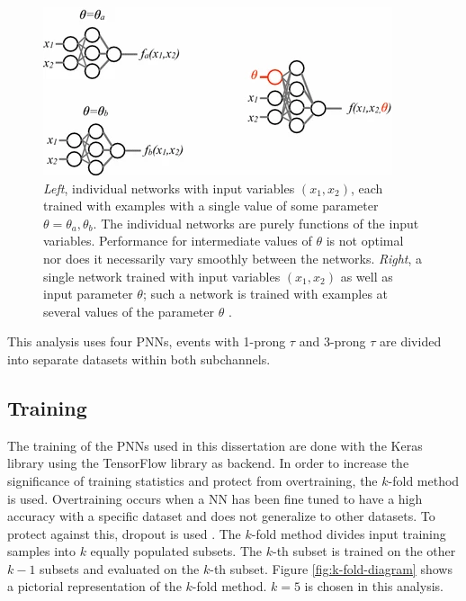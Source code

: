 		\begin{figure}	
			\begin{center}
				\includegraphics[width=.6\textwidth,keepaspectratio=true]{chapters/chapter6_HPlus/images/PNN_Diagram.png}
			\end{center}
			\caption{\textit{Left}, individual networks with input variables $(x_{1},x_{2})$, each trained with examples with a single value of some parameter $\theta = \theta_{a}, \theta_{b}$. The individual networks are purely functions of the input variables. Performance for intermediate values of $\theta$ is not optimal nor does it necessarily vary smoothly between the networks. \textit{Right}, a single network trained with input variables $(x_{1},x_{2})$ as well as input parameter $\theta$; such a network is trained with examples at several values of the parameter $\theta$ \cite{PNN}.}
			\label{fig:PNN-diagram}
		\end{figure}	

			This analysis uses four PNNs, events with 1-prong $\tau$ and 3-prong $\tau$ are divided into separate datasets within both subchannels.

		\subsection{Training}\label{ssec:training}
			The training of the PNNs used in this dissertation are done with the Keras \cite{keras} library using the TensorFlow \cite{tensorflow2015-whitepaper} library as backend. In order to increase the significance of training statistics and protect from overtraining, the $k$-fold method is used. Overtraining occurs when a NN has been fine tuned to have a high accuracy with a specific dataset and does not generalize to other datasets. To protect against this, dropout is used \cite{dropout}. The $k$-fold method divides input training samples into $k$ equally populated subsets. The $k$-th subset is trained on the other $k-1$ subsets and evaluated on the $k$-th subset. Figure \ref{fig:k-fold-diagram} shows a pictorial representation of the $k$-fold method. $k=5$ is chosen in this analysis.

